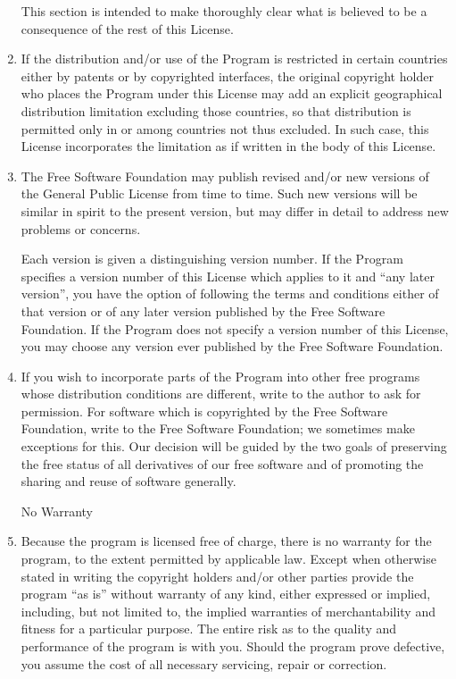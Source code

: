 \documentclass{article}
\begin{document}
\begin{enumerate}
This section is intended to make thoroughly clear what is believed to
be a consequence of the rest of this License.

\item
If the distribution and/or use of the Program is restricted in
certain countries either by patents or by copyrighted interfaces, the
original copyright holder who places the Program under this License
may add an explicit geographical distribution limitation excluding
those countries, so that distribution is permitted only in or among
countries not thus excluded.  In such case, this License incorporates
the limitation as if written in the body of this License.

\item
The Free Software Foundation may publish revised and/or new versions
of the General Public License from time to time.  Such new versions will
be similar in spirit to the present version, but may differ in detail to
address new problems or concerns.

Each version is given a distinguishing version number.  If the Program
specifies a version number of this License which applies to it and ``any
later version'', you have the option of following the terms and conditions
either of that version or of any later version published by the Free
Software Foundation.  If the Program does not specify a version number of
this License, you may choose any version ever published by the Free Software
Foundation.

\item
If you wish to incorporate parts of the Program into other free
programs whose distribution conditions are different, write to the author
to ask for permission.  For software which is copyrighted by the Free
Software Foundation, write to the Free Software Foundation; we sometimes
make exceptions for this.  Our decision will be guided by the two goals
of preserving the free status of all derivatives of our free software and
of promoting the sharing and reuse of software generally.

\begin{center}
{\Large\sc
No Warranty
}
\end{center}

\item
{\sc Because the program is licensed free of charge, there is no warranty
for the program, to the extent permitted by applicable law.  Except when
otherwise stated in writing the copyright holders and/or other parties
provide the program ``as is'' without warranty of any kind, either expressed
or implied, including, but not limited to, the implied warranties of
merchantability and fitness for a particular purpose.  The entire risk as
to the quality and performance of the program is with you.  Should the
program prove defective, you assume the cost of all necessary servicing,
repair or correction.}


\end{enumerate}
\end{document}
